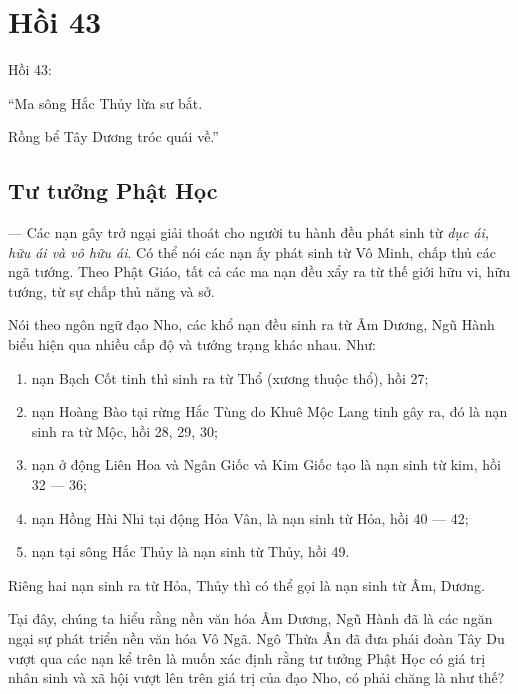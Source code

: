 \chapter{Hồi 43} %
\label{cha:hoi_43}

Hồi 43:

\begin{itshape}
``Ma sông Hắc Thủy lừa sư bắt.

Rồng bể Tây Dương tróc quái về.''
\end{itshape}

\section{Tư tưởng Phật Học} %
\label{sec:43_phat_hoc}

— Các nạn gây trở ngại giải thoát cho người tu hành đều phát sinh từ \emph{dục ái, hữu ái và vô hữu ái}. Có thể nói các nạn ấy phát sinh từ Vô Minh, chấp thủ các ngã tướng. Theo Phật Giáo, tất cả các ma nạn đều xẩy ra từ thế giới hữu vi, hữu tướng, từ sự chấp thủ năng và sở.

Nói theo ngôn ngữ đạo Nho, các khổ nạn đều sinh ra từ Âm Dương, Ngũ Hành biểu hiện qua nhiều cấp độ và tướng trạng khác nhau. Như:

\begin{enumerate}[label=\itshape\arabic*\upshape/]
    \item nạn Bạch Cốt tinh thì sinh ra từ Thổ (xương thuộc thổ), hồi 27;

    \item nạn Hoàng Bào tại rừng Hắc Tùng do Khuê Mộc Lang tinh gây ra, đó là nạn sinh ra từ Mộc, hồi 28, 29, 30;

    \item nạn ở động Liên Hoa và Ngân Giốc và Kim Giốc tạo là nạn sinh từ kim, hồi 32 — 36;

    \item nạn Hồng Hài Nhi tại động Hỏa Vân, là nạn sinh từ Hỏa, hồi 40 — 42;

    \item nạn tại sông Hắc Thủy là nạn sinh từ Thủy, hồi 49.
\end{enumerate}

Riêng hai nạn sinh ra từ Hỏa, Thủy thì có thể gọi là nạn sinh từ Âm, Dương.

Tại đây, chúng ta hiểu rằng nền văn hóa Âm Dương, Ngũ Hành đã là các ngăn ngại sự phát triển nền văn hóa Vô Ngã. Ngô Thừa Ân đã đưa phái đoàn Tây Du vượt qua các nạn kể trên là muốn xác định rằng tư tưởng Phật Học có giá trị nhân sinh và xã hội vượt lên trên giá trị của đạo Nho, có phải chăng là như thế?

